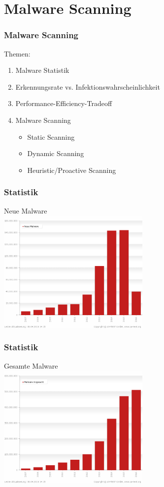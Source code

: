 \documentclass{beamer}
\begin{document}
\section{Malware Scanning}
\begin{frame}
\frametitle{Malware Scanning}

\begin{block}{Themen:}
\begin{enumerate}
\item Malware Statistik
\item Erkennungsrate vs. Infektionswahrscheinlichkeit
\item Performance-Efficiency-Tradeoff
\item Malware Scanning
\begin{itemize}
\item Static Scanning
\item Dynamic Scanning
\item Heuristic/Proactive Scanning
\end{itemize}
\end{enumerate}
\end{block}
\end{frame}

\begin{frame}
\frametitle{Statistik}

Neue Malware \\
\includegraphics[height=6cm]{bilder/growth.png}
\end{frame}

\begin{frame}
\frametitle{Statistik}
Gesamte Malware \\
\includegraphics[height=6cm]{bilder/total.png}
\end{frame}
\end{document}
